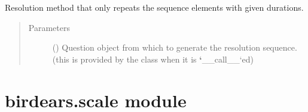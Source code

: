 \documentclass[letterpaper,10pt,english]{sphinxmanual}
\begin{document}

\begin{fulllineitems}
\label{\detokenize{index:birdears.resolution.repeat_only}}
Resolution method that only repeats the sequence elements with given
durations.
\begin{quote}\begin{description}
\item[{Parameters}] \leavevmode
{} () \textendash{} Question object from which to generate the
resolution sequence. (this is provided by the  class
when it is {\color{red}\bfseries{}{}`}\_\_call\_\_{}`ed)

\end{description}\end{quote}

\end{fulllineitems}



\section{birdears.scale module}
\label{\detokenize{index:module-birdears.scale}}\label{\detokenize{index:birdears-scale-module}}
\end{document}
